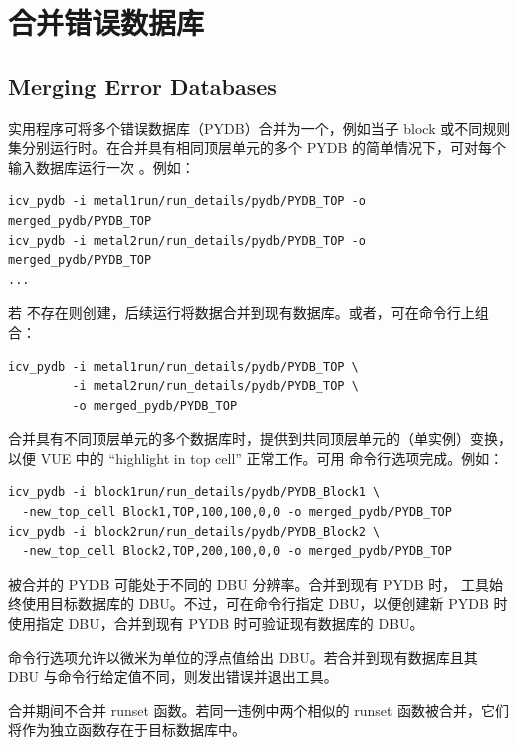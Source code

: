 \section{合并错误数据库}
\subsection*{Merging Error Databases}

 实用程序可将多个错误数据库（PYDB）合并为一个，例如当子 block 或不同规则集分别运行时。在合并具有相同顶层单元的多个 PYDB 的简单情况下，可对每个输入数据库运行一次 。例如：
\begin{lstlisting}[style=shell]
icv_pydb -i metal1run/run_details/pydb/PYDB_TOP -o merged_pydb/PYDB_TOP
icv_pydb -i metal2run/run_details/pydb/PYDB_TOP -o merged_pydb/PYDB_TOP
...
\end{lstlisting}

若  不存在则创建，后续运行将数据合并到现有数据库。或者，可在命令行上组合：
\begin{lstlisting}[style=shell]
icv_pydb -i metal1run/run_details/pydb/PYDB_TOP \
         -i metal2run/run_details/pydb/PYDB_TOP \
         -o merged_pydb/PYDB_TOP
\end{lstlisting}

合并具有不同顶层单元的多个数据库时，提供到共同顶层单元的（单实例）变换，以便 VUE 中的 ``highlight in top cell'' 正常工作。可用  命令行选项完成。例如：
\begin{lstlisting}[style=shell]
icv_pydb -i block1run/run_details/pydb/PYDB_Block1 \
  -new_top_cell Block1,TOP,100,100,0,0 -o merged_pydb/PYDB_TOP
icv_pydb -i block2run/run_details/pydb/PYDB_Block2 \
  -new_top_cell Block2,TOP,200,100,0,0 -o merged_pydb/PYDB_TOP
\end{lstlisting}

被合并的 PYDB 可能处于不同的 DBU 分辨率。合并到现有 PYDB 时， 工具始终使用目标数据库的 DBU。不过，可在命令行指定 DBU，以便创建新 PYDB 时使用指定 DBU，合并到现有 PYDB 时可验证现有数据库的 DBU。

\cmd{-dbu} 命令行选项允许以微米为单位的浮点值给出 DBU。若合并到现有数据库且其 DBU 与命令行给定值不同，则发出错误并退出工具。

\begin{noteBox}
合并期间不合并 runset 函数。若同一违例中两个相似的 runset 函数被合并，它们将作为独立函数存在于目标数据库中。
\end{noteBox}

